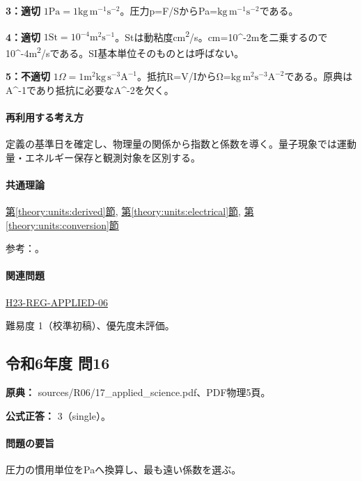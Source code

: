 \noindent\textbf{3：適切} \(1\mathrm{Pa}=1\mathrm{kg\,m^{-1}s^{-2}}\)。圧力p=\allowbreak{}F/SからPa=\(\mathrm{kg\,m^{-1}s^{-2}}\)である。\par

\noindent\textbf{4：適切} \(1\mathrm{St}=10^{-4}\mathrm{m^2s^{-1}}\)。Stは動粘度cm\textsuperscript{2}/s。cm=\allowbreak{}10\textasciicircum{}-2mを二乗するので10\textasciicircum{}-4m\textsuperscript{2}/sである。SI基本単位そのものとは呼ばない。\par

\noindent\textbf{5：不適切} \(1\Omega=1\mathrm{m^2kg\,s^{-3}A^{-1}}\)。抵抗R=\allowbreak{}V/IからΩ=\(\mathrm{kg\,m^2s^{-3}A^{-2}}\)である。原典はA\textasciicircum{}-1であり抵抗に必要なA\textasciicircum{}-2を欠く。\par

\paragraph{再利用する考え方} 定義の基準日を確定し、物理量の関係から指数と係数を導く。量子現象では運動量・エネルギー保存と観測対象を区別する。

\paragraph{共通理論} \hyperref[theory:units:derived]{第\ref*{theory:units:derived}節}, \hyperref[theory:units:electrical]{第\ref*{theory:units:electrical}節}, \hyperref[theory:units:conversion]{第\ref*{theory:units:conversion}節}

\par 参考：\cite{si_nist811}。

\paragraph{関連問題} \hyperref[q:h23-reg-applied-06]{H23-REG-APPLIED-06}

\par 難易度 1（校準初稿）、優先度未評価。

\subsection{令和6年度 問16}
\label{q:r06-reg-applied-16}

\noindent\textbf{原典：} sources/R06/17\_applied\_science.pdf、PDF物理5頁。

\textbf{公式正答：} 3（single）。

\paragraph{問題の要旨} 圧力の慣用単位をPaへ換算し、最も遠い係数を選ぶ。

